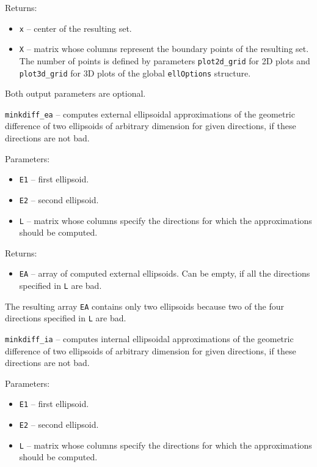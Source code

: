 Returns:
\begin{itemize}
\item {\tt x} -- center of the resulting set.
\item {\tt X} -- matrix whose columns represent the boundary points of the
resulting set. The number of points is defined by parameters
{\tt plot2d\_grid} for 2D plots and {\tt plot3d\_grid} for 3D plots of the
global {\tt ellOptions} structure.
\end{itemize}
Both output parameters are optional.

\newpage

{\Large {\tt minkdiff\_ea}} -- computes external ellipsoidal approximations
of the geometric difference of two ellipsoids of arbitrary dimension
for given directions, if these directions are not bad.

Parameters:
\begin{itemize}
\item {\tt E1} -- first ellipsoid.
\item {\tt E2} -- second ellipsoid.
\item {\tt L} -- matrix whose columns specify the directions for which
the approximations should be computed.
\end{itemize}

Returns:
\begin{itemize}
\item {\tt EA} -- array of computed external ellipsoids. Can be empty, if
all the directions specified in {\tt L} are bad.
\end{itemize}


The resulting array {\tt EA} contains only two ellipsoids because two
of the four directions specified in {\tt L} are bad.

\newpage

{\Large {\tt minkdiff\_ia}} -- computes internal ellipsoidal approximations
of the geometric difference of two ellipsoids of arbitrary dimension
for given directions, if these directions are not bad.

Parameters:
\begin{itemize}
\item {\tt E1} -- first ellipsoid.
\item {\tt E2} -- second ellipsoid.
\item {\tt L} -- matrix whose columns specify the directions for which
the approximations should be computed.
\end{itemize}


